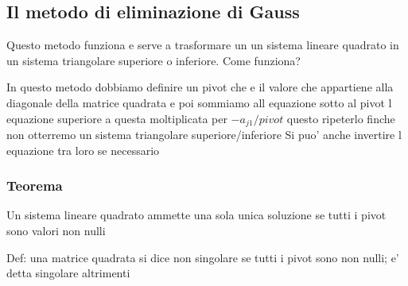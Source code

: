 \documentclass{article}
\begin{document}
\subsection{Il metodo di eliminazione di Gauss}
\begin{flushleft}
  Questo metodo funziona e serve a trasformare un un sistema lineare quadrato in un sistema triangolare
  superiore o inferiore. Come funziona?
\end{flushleft}
\begin{flushleft}
  In questo metodo dobbiamo definire un pivot che e il valore che appartiene
  alla diagonale della matrice quadrata e poi sommiamo all equazione sotto al pivot
  l equazione superiore a questa moltiplicata per $-a_{j1}/ pivot$ questo ripeterlo finche non otterremo un sistema triangolare superiore/inferiore
  Si puo' anche invertire l equazione tra loro se necessario
\end{flushleft}
\subsubsection{Teorema}
\begin{flushleft}
  Un sistema lineare quadrato ammette una sola unica soluzione se tutti i pivot sono valori non nulli
\end{flushleft}
\begin{flushleft}
  Def: una matrice quadrata si dice non singolare se tutti i pivot sono non nulli; e' detta singolare altrimenti
\end{flushleft}
\end{document}
